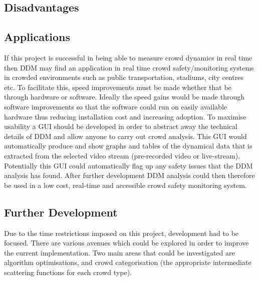 \documentclass[11pt]{article}
\begin{document}
\subsection{Disadvantages}

\subsection{Applications}
If this project is successful in being able to measure crowd dynamics in real time then DDM may find an application in real time crowd safety/monitoring systems in crowded environments such as public transportation, stadiums, city centres etc. To facilitate this, speed improvements must be made whether that be through hardware or software. Ideally the speed gains would be made through software improvements so that the software could run on easily available hardware thus reducing installation cost and increasing adoption. To maximise usability a GUI should be developed in order to abstract away the technical details of DDM and allow anyone to carry out crowd analysis. This GUI would automatically produce and show graphs and tables of the dynamical data that is extracted from the selected video stream (pre-recorded video or live-stream). Potentially this GUI could automatically flag up any safety issues that the DDM analysis has found. After further development DDM analysis could then therefore be used in a low cost, real-time and accessible crowd safety monitoring system.

\subsection{Further Development}
Due to the time restrictions imposed on this project, development had to be focused. There are various avenues which could be explored in order to improve the current implementation. Two main areas that could be investigated are algorithm optimisations, and crowd categorisation (the appropriate intermediate scattering functions for each crowd type).
\end{document}

